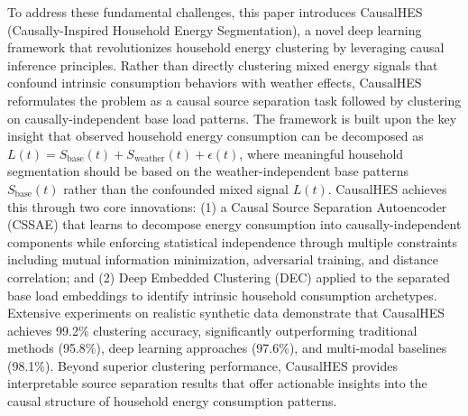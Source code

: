 \documentclass[journal]{IEEEtran}
\begin{document}
To address these fundamental challenges, this paper introduces CausalHES (Causally-Inspired Household Energy Segmentation), a novel deep learning framework that revolutionizes household energy clustering by leveraging causal inference principles. Rather than directly clustering mixed energy signals that confound intrinsic consumption behaviors with weather effects, CausalHES reformulates the problem as a causal source separation task followed by clustering on causally-independent base load patterns. The framework is built upon the key insight that observed household energy consumption can be decomposed as $L(t) = S_{\text{base}}(t) + S_{\text{weather}}(t) + \epsilon(t)$, where meaningful household segmentation should be based on the weather-independent base patterns $S_{\text{base}}(t)$ rather than the confounded mixed signal $L(t)$. CausalHES achieves this through two core innovations: (1) a Causal Source Separation Autoencoder (CSSAE) that learns to decompose energy consumption into causally-independent components while enforcing statistical independence through multiple constraints including mutual information minimization, adversarial training, and distance correlation; and (2) Deep Embedded Clustering (DEC) applied to the separated base load embeddings to identify intrinsic household consumption archetypes. Extensive experiments on realistic synthetic data demonstrate that CausalHES achieves 99.2\% clustering accuracy, significantly outperforming traditional methods (95.8\%), deep learning approaches (97.6\%), and multi-modal baselines (98.1\%). Beyond superior clustering performance, CausalHES provides interpretable source separation results that offer actionable insights into the causal structure of household energy consumption patterns.
\end{document}
